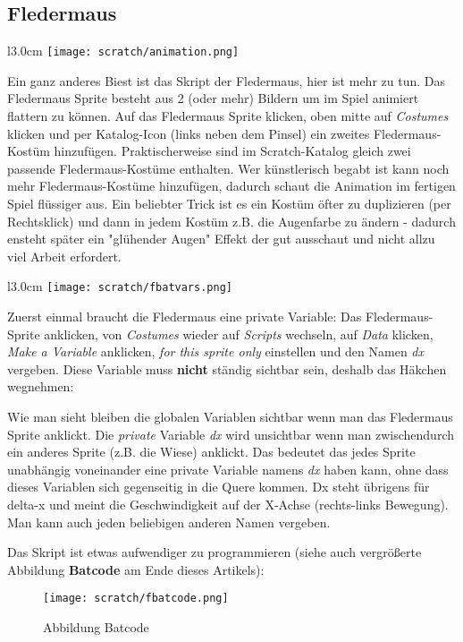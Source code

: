 \documentclass[10pt,a4paper,ngerman,twoside]{article} %
\begin{document}
\subsection*{Fledermaus}
\begin{wrapfigure}{l}{3.0cm}
\texttt{[image: scratch/animation.png]}
\end{wrapfigure}
Ein ganz anderes Biest ist das Skript der Fledermaus, hier ist mehr zu tun. Das Fledermaus Sprite besteht aus 2 (oder mehr) Bildern um im Spiel animiert flattern zu können. Auf das Fledermaus Sprite klicken, oben mitte auf \textit{Costumes} klicken und per Katalog-Icon (links neben dem Pinsel) ein zweites Fledermaus-Kostüm hinzufügen. Praktischerweise sind im Scratch-Katalog gleich zwei passende Fledermaus-Kostüme enthalten. Wer künstlerisch begabt ist kann noch mehr Fledermaus-Kostüme hinzufügen, dadurch schaut die Animation im fertigen Spiel flüssiger aus. Ein beliebter Trick ist es ein Kostüm öfter zu duplizieren (per Rechtsklick) und dann in jedem Kostüm z.B. die Augenfarbe zu ändern - dadurch ensteht später ein "glühender Augen" Effekt der gut ausschaut und nicht allzu viel Arbeit erfordert. 

\begin{wrapfigure}{l}{3.0cm}
\texttt{[image: scratch/fbatvars.png]}
\end{wrapfigure}
Zuerst einmal braucht die Fledermaus eine private Variable: Das Fledermaus-Sprite anklicken, von \textit{Costumes} wieder auf \textit{Scripts} wechseln,  auf \textit{Data} klicken, \textit{Make a Variable} anklicken, \textit{for this sprite only} einstellen und den Namen \textit{dx} vergeben. Diese Variable muss \textbf{nicht} ständig sichtbar sein, deshalb das Häkchen wegnehmen:

Wie man sieht bleiben die globalen Variablen sichtbar wenn man das Fledermaus Sprite anklickt. Die \textit{private} Variable \textit{dx} wird unsichtbar wenn man zwischendurch ein anderes Sprite (z.B. die Wiese) anklickt. Das bedeutet das jedes Sprite unabhängig voneinander eine private Variable namens \textit{dx} haben kann, ohne dass dieses Variablen sich gegenseitig in die Quere kommen. Dx steht übrigens für delta-x und meint die Geschwindigkeit auf der X-Achse (rechts-links Bewegung). Man kann auch jeden beliebigen anderen Namen vergeben.

Das Skript ist etwas aufwendiger zu programmieren (siehe auch vergrößerte Abbildung \textbf{Batcode} am Ende dieses Artikels):

\begin{figure}
\texttt{[image: scratch/fbatcode.png]}
\caption{Abbildung Batcode}
\end{figure}
\end{document}
